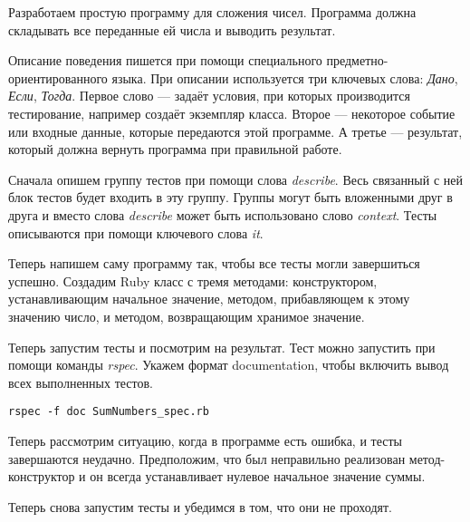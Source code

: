 Разработаем простую программу для сложения чисел. Программа должна складывать все переданные ей числа и выводить результат.

Описание поведения пишется при помощи специального предметно-ориентированного языка. При описании используется три ключевых слова: \emph{Дано}, \emph{Если}, \emph{Тогда}. Первое слово --- задаёт условия, при которых производится тестирование, например создаёт экземпляр класса. Второе --- некоторое событие или входные данные, которые передаются этой программе. А третье --- результат, который должна вернуть программа при правильной работе.

Сначала опишем группу тестов при помощи слова \emph{describe}. Весь связанный с ней блок тестов будет входить в эту группу. Группы могут быть вложенными друг в друга и вместо слова \emph{describe} может быть использовано слово \emph{context}. Тесты описываются при помощи ключевого слова \emph{it}.



Теперь напишем саму программу так, чтобы все тесты могли завершиться успешно. Создадим Ruby класс с тремя методами: конструктором, устанавливающим начальное значение, методом, прибавляющем к этому значению число, и методом, возвращающим хранимое значение.



Теперь запустим тесты и посмотрим на результат. Тест можно запустить при помощи команды \emph{rspec}. Укажем формат documentation, чтобы включить вывод всех выполненных тестов.

\begin{verbatim}
rspec -f doc SumNumbers_spec.rb
\end{verbatim}


Теперь рассмотрим ситуацию, когда в программе есть ошибка, и тесты завершаются неудачно. Предположим, что был неправильно реализован метод-конструктор и он всегда устанавливает нулевое начальное значение суммы.



Теперь снова запустим тесты и убедимся в том, что они не проходят.


